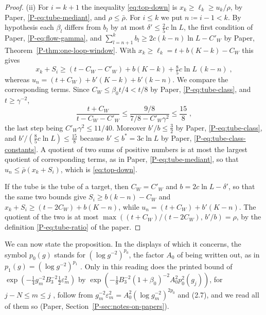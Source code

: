 \documentclass[11pt]{preprint}
\numberwithin{equation}{section}
\theoremstyle{definition}
\theoremstyle{remark}
\theoremstyle{plain}
\begin{document}
\begin{proof}
(ii) For $i = k + 1$ the inequality \eqref{eq:top-down} is $x_k \geq \ell_k \geq u_k/\rho$, by Paper, \eqref{P-eq:tube-mediant}, and $\rho \leq \bar\rho$. For $i \leq k$ we put $n \coloneqq i - 1 < k$. By hypothesis each $\beta_l$ differs from $b_l$ by at most $\delta' \leq \frac25c\ln L$, the first condition of Paper, \eqref{P-eq:flow-gamma}, and $\sum_{l=n+1}^{k}b_l \geq 2c(k - n)\ln L - C'_W$ by Paper, Theorem~\ref{P-thm:one-loop-window}. With $x_k \geq \ell_k = t + b(K - k) - C_W$ this gives
\begin{equation}\label{eq:top-down-lower}
    x_k + S_i \geq (t - C_W - C'_W) + b(K - k) + \tfrac85c\ln L\,(k - n)\;,
\end{equation}
whereas $u_n = (t + C_W) + b'(K - k) + b'(k - n)$. We compare the corresponding terms. Since $C_W \leq \beta_0t/4 < t/8$ by Paper, \eqref{P-eq:tube-class}, and $t \geq \gamma^{-2}$,
\begin{equation}\label{eq:constant-terms}
    \frac{t + C_W}{t - C_W - C'_W} \leq \frac{9/8}{7/8 - C'_W\gamma^2} \leq \frac{15}{8}\;,
\end{equation}
the last step being $C'_W\gamma^2 \leq 11/40$. Moreover $b'/b \leq \frac32$ by Paper, \eqref{P-eq:tube-class}, and $b'/(\frac85c\ln L) \leq \frac{15}{8}$ because $b' \leq b^* = 3c\ln L$ by Paper, \eqref{P-eq:tube-class-constants}. A quotient of two sums of positive numbers is at most the largest quotient of corresponding terms, as in Paper, \eqref{P-eq:tube-mediant}, so that $u_n \leq \bar\rho(x_k + S_i)$, which is \eqref{eq:top-down}.

If the tube is the tube of a target, then $C_W = C'_W$ and $b = 2c\ln L - \delta'$, so that the same two bounds give $S_i \geq b(k - n) - C_W$ and $x_k + S_i \geq (t - 2C_W) + b(K - n)$, while $u_n = (t + C_W) + b'(K - n)$. The quotient of the two is at most $\max((t + C_W)/(t - 2C_W),\, b'/b) = \rho$, by the definition \eqref{P-eq:tube-ratio} of the paper.
\end{proof}

We can now state the proposition. In the displays of \cite[pp.~380--383]{BalabanLFR2} which it concerns, the symbol $p_0(g)$ stands for $(\log g^{-2})^{p_0}$, the factor $A_0$ of \cite[(2.4), p.~255]{BalabanCRE} being written out, as in $p_1(g) = (\log g^{-2})^{p_1}$ \cite[p.~183]{BalabanLFR1}. Only in this reading does the printed bound of $\exp(-\frac14g_m^{-2}B_3^{-2}\frac12\varepsilon_m^2)$ by $\exp(-\frac18B_3^{-2}(1 + \beta_0)^{-2}A_0^2p_0^2(g_j))$, for $j - N \leq m \leq j$ \cite[p.~381]{BalabanLFR2}, follow from $g_m^{-2}\varepsilon_m^2 = A_0^2(\log g_m^{-2})^{2p_0}$ and (2.7), and we read all of them so (Paper, Section~\ref{P-sec:notes-on-papers}).
\end{document}
